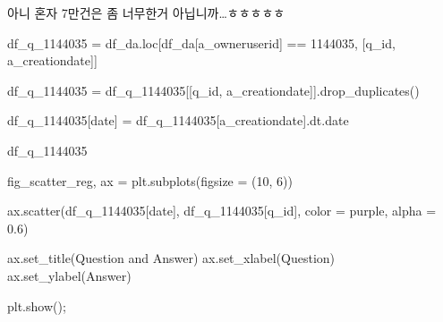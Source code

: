 \documentclass[
  letterpaper,
  DIV=11,
  numbers=noendperiod]{scrartcl}
\newenvironment{Shaded}{\begin{snugshade}}{\end{snugshade}}
\newcommand{\DecValTok}[1]{\textcolor[rgb]{0.68,0.00,0.00}{#1}}
\newcommand{\FloatTok}[1]{\textcolor[rgb]{0.68,0.00,0.00}{#1}}
\newcommand{\NormalTok}[1]{\textcolor[rgb]{0.00,0.23,0.31}{#1}}
\newcommand{\OperatorTok}[1]{\textcolor[rgb]{0.37,0.37,0.37}{#1}}
\newcommand{\StringTok}[1]{\textcolor[rgb]{0.13,0.47,0.30}{#1}}
\begin{document}
아니 혼자 7만건은 좀 너무한거 아닙니까\ldots ㅎㅎㅎㅎㅎ

\begin{Shaded}
\begin{Highlighting}[]
\NormalTok{df\_q\_1144035 }\OperatorTok{=}\NormalTok{ df\_da.loc[df\_da[}\StringTok{\textquotesingle{}a\_owneruserid\textquotesingle{}}\NormalTok{] }\OperatorTok{==} \DecValTok{1144035}\NormalTok{, [}\StringTok{\textquotesingle{}q\_id\textquotesingle{}}\NormalTok{, }\StringTok{\textquotesingle{}a\_creationdate\textquotesingle{}}\NormalTok{]]}
\end{Highlighting}
\end{Shaded}

\begin{Shaded}
\begin{Highlighting}[]
\NormalTok{df\_q\_1144035 }\OperatorTok{=}\NormalTok{ df\_q\_1144035[[}\StringTok{\textquotesingle{}q\_id\textquotesingle{}}\NormalTok{, }\StringTok{\textquotesingle{}a\_creationdate\textquotesingle{}}\NormalTok{]].drop\_duplicates()}
\end{Highlighting}
\end{Shaded}

\begin{Shaded}
\begin{Highlighting}[]
\NormalTok{df\_q\_1144035[}\StringTok{\textquotesingle{}date\textquotesingle{}}\NormalTok{] }\OperatorTok{=}\NormalTok{ df\_q\_1144035[}\StringTok{\textquotesingle{}a\_creationdate\textquotesingle{}}\NormalTok{].dt.date}
\end{Highlighting}
\end{Shaded}

\begin{Shaded}
\begin{Highlighting}[]
\NormalTok{df\_q\_1144035}
\end{Highlighting}
\end{Shaded}

\begin{Shaded}
\begin{Highlighting}[]
\NormalTok{fig\_scatter\_reg, ax }\OperatorTok{=}\NormalTok{ plt.subplots(figsize }\OperatorTok{=}\NormalTok{ (}\DecValTok{10}\NormalTok{, }\DecValTok{6}\NormalTok{))}

\NormalTok{ax.scatter(df\_q\_1144035[}\StringTok{\textquotesingle{}date\textquotesingle{}}\NormalTok{], df\_q\_1144035[}\StringTok{\textquotesingle{}q\_id\textquotesingle{}}\NormalTok{], color }\OperatorTok{=} \StringTok{\textquotesingle{}purple\textquotesingle{}}\NormalTok{, alpha }\OperatorTok{=} \FloatTok{0.6}\NormalTok{)}

\NormalTok{ax.set\_title(}\StringTok{\textquotesingle{}Question and Answer\textquotesingle{}}\NormalTok{)}
\NormalTok{ax.set\_xlabel(}\StringTok{\textquotesingle{}Question\textquotesingle{}}\NormalTok{)}
\NormalTok{ax.set\_ylabel(}\StringTok{\textquotesingle{}Answer\textquotesingle{}}\NormalTok{)}


\NormalTok{plt.show()}\OperatorTok{;}
\end{Highlighting}
\end{Shaded}
\end{document}
